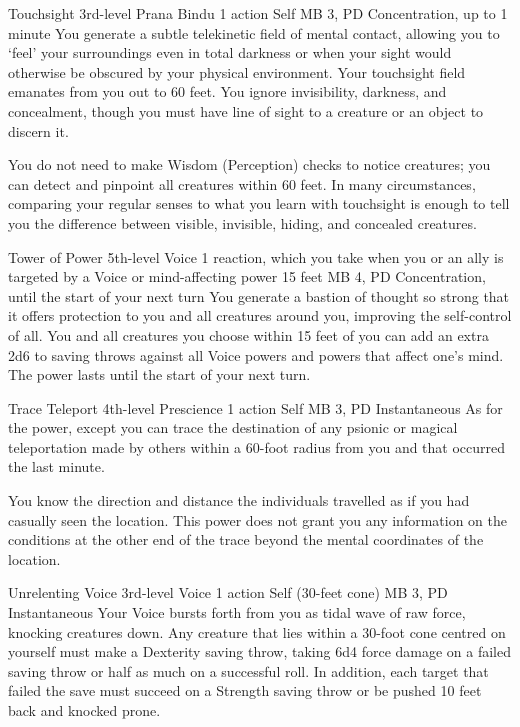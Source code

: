 \DndPowerHeader%
  {Touchsight}
  {3rd-level Prana Bindu}
  {1 action}
  {Self}
  {MB 3, PD \lvlthree}
  {Concentration, up to 1 minute}
  You generate a subtle telekinetic field of mental contact,
  allowing you to `feel' your surroundings even in total darkness
  or when your sight would otherwise be obscured
  by your physical environment.
  Your touchsight field emanates from you out to 60 feet.
  You ignore invisibility, darkness, and concealment,
  though you must have line of sight to a creature or an object
  to discern it.
  
  You do not need to make Wisdom (Perception) checks
  to notice creatures; you can detect and pinpoint all creatures
  within 60 feet.
  In many circumstances, comparing your regular senses
  to what you learn with touchsight is enough to tell you
  the difference between visible, invisible, hiding,
  and concealed creatures.

\DndPowerHeader%
  {Tower of Power}
  {5th-level Voice}
  {1 reaction, which you take when you or an ally is
    targeted by a Voice or mind-affecting power}
  {15 feet}
  {MB 4, PD \lvlfive}
  {Concentration, until the start of your next turn}
  You generate a bastion of thought so strong
  that it offers protection to you and all creatures around you,
  improving the self-control of all.
  You and all creatures you choose within 15 feet of you
  can add an extra 2d6 to saving throws against all Voice powers
  and powers that affect one's mind.
  The power lasts until the start of your next turn.

\DndPowerHeader%
  {Trace Teleport}
  {4th-level Prescience}
  {1 action}
  {Self}
  {MB 3, PD \lvlfour}
  {Instantaneous}
  As for the  power,
  except you can trace the destination of any psionic
  or magical teleportation made by others within
  a 60-foot radius from you
  and that occurred the last minute.

  You know the direction and distance the individuals travelled
  as if you had casually seen the location.
  This power does not grant you any information on the conditions
  at the other end of the trace
  beyond the mental coordinates of the location.

\DndPowerHeader%
  {Unrelenting Voice}
  {3rd-level Voice}
  {1 action}
  {Self (30-feet cone)}
  {MB 3, PD \lvlthree}
  {Instantaneous}
Your Voice bursts forth from you as tidal wave of raw force,
knocking creatures down.
Any creature that lies within a 30-foot cone centred on yourself
must make a Dexterity saving throw,
taking 6d4 force damage on a failed saving throw or half as much on
a successful roll.
In addition, each target that failed the save
must succeed on a Strength saving throw or be pushed 10 feet back
and knocked prone.

